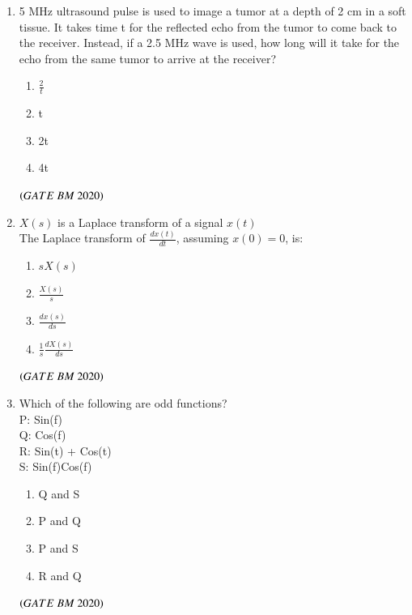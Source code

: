 \documentclass[journal,12pt,onecolumn]{IEEEtran}
\theoremstyle{remark}
\begin{document}
\begin{enumerate}
\item 5 MHz ultrasound pulse is used to image a tumor at a depth of 2 cm in a soft tissue. It takes time t for the reflected echo from the tumor to come back to the receiver. Instead, if a 2.5 MHz wave is used, how long will it take for the echo from the same tumor to arrive at the receiver?
\begin{enumerate}[label=\alph*)] 
\item\hspace{0.5cm}$\frac{2}{t}$
\item\hspace{0.5cm}t
\item\hspace{0.5cm}2t
\item\hspace{0.5cm}4t
\end{enumerate}
 \hfill $\left(GATE\ BM\ 2020\right)$
 
\item $X(s)$ is a Laplace transform of a signal $x(t)$\\
The Laplace transform of $\frac{dx(t)}{dt}$, assuming $x(0) = 0$, is:
\begin{enumerate}[label=\alph*)] 
\item\hspace{0.5cm}$sX(s)$
\item\hspace{0.5cm}$\frac{X(s)}{s}$
\item\hspace{0.5cm}$\frac{dx(s)}{ds}$
\item\hspace{0.5cm}$\frac{1}{s} \frac{dX(s)}{ds}$
\end{enumerate}
 \hfill $\left(GATE\ BM\ 2020\right)$
 
\item Which of the following are odd functions?\\
P: Sin(f)\\
Q: Cos(f)\\
R: Sin(t) + Cos(t)\\
S: Sin(f)Cos(f)\\
\begin{enumerate}[label=\alph*)] 
\item\hspace{0.5cm}Q and S
\item\hspace{0.5cm}P and Q
\item\hspace{0.5cm}P and S
\item\hspace{0.5cm}R and Q
\end{enumerate}
 \hfill $\left(GATE\ BM\ 2020\right)$
 

\end{enumerate}
\end{document}
